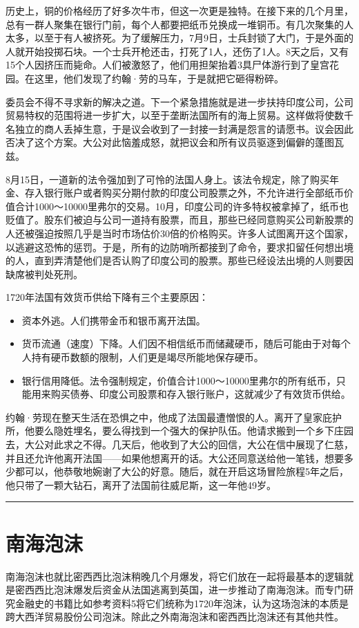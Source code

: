\documentclass[12pt,oneside]{book}
\newcommand\hr{\par\noindent\hrule}
\begin{document}
历史上，铜的价格经历了好多次牛市，但这一次更是独特。在接下来的几个月里，总有一群人聚集在银行门前，每个人都要把纸币兑换成一堆铜币。有几次聚集的人太多，以至于有人被挤死。为了缓解压力，7月9日，士兵封锁了大门，于是外面的人就开始投掷石块。一个士兵开枪还击，打死了1人，还伤了1人。8天之后，又有15个人因挤压而毙命。人们被激怒了，他们用担架抬着3具尸体游行到了皇宫花园。在这里，他们发现了约翰·劳的马车，于是就把它砸得粉碎。

委员会不得不寻求新的解决之道。下一个紧急措施就是进一步扶持印度公司，公司贸易特权的范围将进一步扩大，以至于垄断法国所有的海上贸易。这样做将使数千名独立的商人丢掉生意，于是议会收到了一封接一封满是怨言的请愿书。议会因此否决了这个方案。大公对此恼羞成怒，就把议会和所有议员驱逐到偏僻的蓬图瓦兹。

8月15日，一道新的法令强加到了可怜的法国人身上。该法令规定，除了购买年金、存入银行账户或者购买分期付款的印度公司股票之外，不允许进行全部纸币价值合计1000～10000里弗尔的交易。10月，印度公司的许多特权被拿掉了，纸币也贬值了。股东们被迫与公司一道持有股票，而且，那些已经同意购买公司新股票的人还被强迫按照几乎是当时市场估价30倍的价格购买。许多人试图离开这个国家，以逃避这恐怖的惩罚。于是，所有的边防哨所都接到了命令，要求扣留任何想出境的人，直到弄清楚他们是否认购了印度公司的股票。那些已经设法出境的人则要因缺席被判处死刑。

1720年法国有效货币供给下降有三个主要原因：

\begin{itemize}
\item 资本外逃。人们携带金币和银币离开法国。
\item 货币流通（速度）下降。人们因不相信纸币而储藏硬币，随后可能由于对每个人持有硬币数额的限制，人们更是竭尽所能地保存硬币。
\item 银行信用降低。法令强制规定，价值合计1000～10000里弗尔的所有纸币，只能用来购买债券、印度公司股票和存入银行账户，这就减少了有效货币供给。
\end{itemize}

约翰·劳现在整天生活在恐惧之中，他成了法国最遭憎恨的人。离开了皇家庇护所，他要么隐姓埋名，要么得找到一个强大的保护队伍。他请求搬到一个乡下庄园去，大公对此求之不得。几天后，他收到了大公的回信，大公在信中展现了仁慈，并且还允许他离开法国——如果他想离开的话。大公还同意送给他一笔钱，想要多少都可以，他恭敬地婉谢了大公的好意。随后，就在开启这场冒险旅程5年之后，他只带了一颗大钻石，离开了法国前往威尼斯，这一年他49岁。
\hr

\section{南海泡沫}
南海泡沫也就比密西西比泡沫稍晚几个月爆发，将它们放在一起将最基本的逻辑就是密西西比泡沫爆发后资金从法国逃离到英国，进一步推动了南海泡沫。而专门研究金融史的书籍比如参考资料5将它们统称为1720年泡沫，认为这场泡沫的本质是跨大西洋贸易股份公司泡沫。除此之外南海泡沫和密西西比泡沫还有其他共性。
\end{document}
